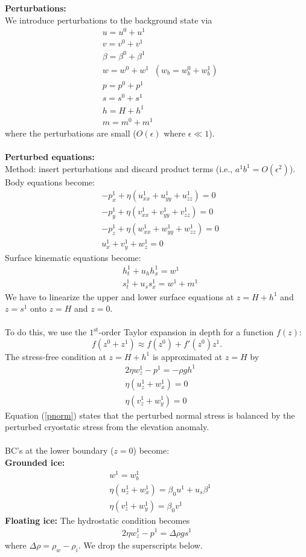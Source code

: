 \documentclass[paper=a4, fontsize=11pt]{article}
\begin{document}
\noindent\textbf{Perturbations:}\\
We introduce perturbations to the background state via
\begin{align}
&u= u^0 +  u^1 \\
&v= v^0 +  v^1 \\
&\beta = \beta^0 + \beta^1 \\
&w =  w^0 + w^1 \;\; (w_b=w_b^0 + w_b^1)\\
&p = p^0 +  p^1\\
&s =  s^0 + s^1 \\
&h = H +  h^1 \\
&m = m^0 + m^1
\end{align}
where the perturbations are small ($O(\epsilon)$ where $\epsilon \ll 1$). \\ \\
\noindent\textbf{Perturbed equations:}\\
Method: insert perturbations and discard product terms (i.e., $a^1b^1=O(\epsilon^2)$).\\
Body equations become:
\begin{align}
&-p_x^1 + \eta (u_{xx}^1 +u_{yy}^1+ u_{zz}^1) = 0 \\
&-p_y^1 + \eta (v_{xx}^1 +v_{yy}^1+ v_{zz}^1) = 0 \\
&-p_z^1 + \eta (w_{xx}^1 +w_{yy}^1+ w_{zz}^1) = 0\\
&u_x^1 + v_y^1 + w_z^1 = 0
\end{align}
Surface kinematic equations become:
\begin{align}
&h_t^1 + u_h h_x^1  = w^1 \label{ht} \\
&s_t^1  + u_s s_x^1 = w^1 + m^1 \label{st}
\end{align}
We have to linearize the upper and lower surface equations at $z=H +  h^1$
and $z= s^1$ onto $z=H$ and $z=0$.
\\ \\
To do this, we
use the $1^\mathrm{st}$-order Taylor expansion in depth for a function $f(z)$:
$$ f(z^0 + z^1) \approx f(z^0) + f'(z^0)z^1. $$
The stress-free condition at $z=H+h^1$ is approximated at $z=H$ by
\begin{align}
&2\eta w_z^1 - p^1 = -\rho g h^1 \label{pnorm} \\
&\eta(u_z^1 +w_x^1) = 0 \\
&\eta(v_z^1 +w_y^1) = 0
\end{align}
Equation (\ref{pnorm}) states that the perturbed normal stress is balanced
by the perturbed cryostatic stress from the elevation anomaly.
\\ \\
BC's at the lower boundary ($z=0$) become:\\
\textbf{Grounded ice:}
\begin{align}
&w^1  = w_b^1\\
&\eta(u_z^1 + w_x^1) = \beta_0 u^1 + u_s\beta^1 \\
&\eta(v_z^1 +w_y^1) = \beta_0 v^1
\end{align}
\textbf{Floating ice:}
The hydrostatic condition becomes
\begin{align}
2\eta w_z^1 - p^1 = \Delta\rho g s^1
\end{align}
where $\Delta\rho = \rho_w-\rho_i$.
We drop the superscripts below.
\end{document}
